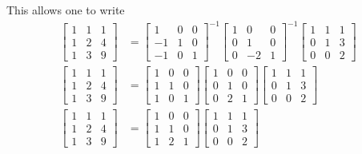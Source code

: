 This allows one to write
\begin{align*}
\begin{bmatrix} 1 & 1 & 1 \\ 1 & 2 & 4 \\ 1 & 3 & 9 \end{bmatrix}
& = \begin{bmatrix} 1 & 0 & 0 \\ -1 & 1 & 0 \\ -1 & 0 & 1 \end{bmatrix}^{-1}
\begin{bmatrix} 1 & 0 & 0 \\ 0 & 1 & 0 \\ 0 & -2 & 1 \end{bmatrix}^{-1}
\begin{bmatrix} 1 & 1 & 1 \\ 0 & 1 & 3 \\ 0 & 0 & 2 \end{bmatrix} \\
\begin{bmatrix} 1 & 1 & 1 \\ 1 & 2 & 4 \\ 1 & 3 & 9 \end{bmatrix}
& = \begin{bmatrix} 1 & 0 & 0 \\ 1 & 1 & 0 \\ 1 & 0 & 1 \end{bmatrix}
\begin{bmatrix} 1 & 0 & 0 \\ 0 & 1 & 0 \\ 0 & 2 & 1 \end{bmatrix}
\begin{bmatrix} 1 & 1 & 1 \\ 0 & 1 & 3 \\ 0 & 0 & 2 \end{bmatrix} \\
\begin{bmatrix} 1 & 1 & 1 \\ 1 & 2 & 4 \\ 1 & 3 & 9 \end{bmatrix}
& = \begin{bmatrix} 1 & 0 & 0 \\ 1 & 1 & 0 \\ 1 & 2 & 1 \end{bmatrix}
\begin{bmatrix} 1 & 1 & 1 \\ 0 & 1 & 3 \\ 0 & 0 & 2 \end{bmatrix} \\
\end{align*}

